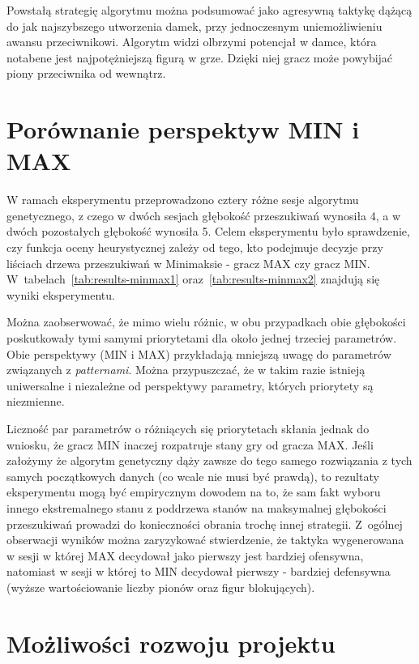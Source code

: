 Powstałą strategię algorytmu można podsumować jako agresywną taktykę dążącą do jak najszybszego utworzenia damek, przy jednoczesnym uniemożliwieniu awansu przeciwnikowi. Algorytm widzi olbrzymi potencjał w damce, która notabene jest najpotężniejszą figurą w grze. Dzięki niej gracz może powybijać piony przeciwnika od wewnątrz.

\section{Porównanie perspektyw MIN i MAX}
\label{sub:min_max}

W ramach eksperymentu przeprowadzono cztery różne sesje algorytmu genetycznego, z czego w dwóch sesjach głębokość przeszukiwań wynosiła 4, a w dwóch pozostałych głębokość wynosiła 5. Celem eksperymentu było sprawdzenie, czy funkcja oceny heurystycznej zależy od tego, kto podejmuje decyzje przy liściach drzewa przeszukiwań w Minimaksie - gracz MAX czy gracz MIN. W~tabelach~\ref{tab:results-minmax1} oraz~\ref{tab:results-minmax2} znajdują się wyniki eksperymentu.





Można zaobserwować, że mimo wielu różnic, w obu przypadkach obie głębokości poskutkowały tymi samymi priorytetami dla około jednej trzeciej parametrów. Obie perspektywy (MIN i MAX) przykładają mniejszą uwagę do parametrów związanych z \textit{patternami}. Można przypuszczać, że w takim razie istnieją uniwersalne i niezależne od perspektywy parametry, których priorytety są niezmienne.

Liczność par parametrów o różniących się priorytetach skłania jednak do wniosku, że gracz MIN inaczej rozpatruje stany gry od gracza MAX. Jeśli założymy że algorytm genetyczny dąży zawsze do tego samego rozwiązania z tych samych początkowych danych (co wcale nie musi być prawdą), to rezultaty eksperymentu mogą być empirycznym dowodem na to, że sam fakt wyboru innego ekstremalnego stanu z poddrzewa stanów na maksymalnej głębokości przeszukiwań prowadzi do konieczności obrania trochę innej strategii. Z~ogólnej obserwacji wyników można zaryzykować stwierdzenie, że taktyka wygenerowana w sesji w której MAX decydował jako pierwszy jest bardziej ofensywna, natomiast w sesji w której to MIN decydował pierwszy - bardziej defensywna (wyższe wartościowanie liczby pionów oraz figur blokujących).

\section{Możliwości rozwoju projektu}

